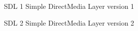 \begin{siglas}
  \item[SDL 1] Simple DirectMedia Layer version 1
  \item[SDL 2] Simple DirectMedia Layer version 2
\end{siglas}
%